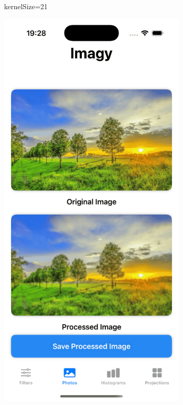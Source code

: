 \documentclass[a4paper]{article}
\begin{document}
\begin{itemize}
\begin{figure}[H]
\begin{subfigure}{0.2\textwidth}
                  \caption{kernelSize=21}
                  \label{fig:dog_averaging_21}
              \end{subfigure}
              \hfill
              \begin{subfigure}{0.2\textwidth}
                  \centering
                  \includegraphics[width=\linewidth]{images/trees_averaging_3.png}

\end{subfigure}
\end{figure}
\end{itemize}
\end{document}
